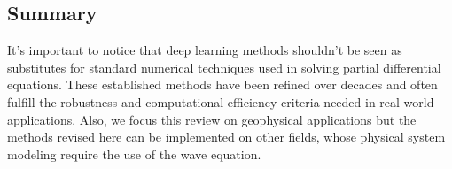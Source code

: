 \documentclass{tufte-handout}
\renewcommand{\citeauthoryear}[2][]{\textcolor{gray}{\citeauthor{#2} (\textcolor{gray}{\citeyear[#1]{#2}})}}
\begin{document}



\subsection{Summary}





It's important to notice that deep learning methods shouldn't be seen as substitutes for standard numerical techniques used in solving partial differential equations. These established methods have been refined over decades and often fulfill the robustness and computational efficiency criteria needed in real-world applications. Also, we focus this review on geophysical applications but the methods revised here can be implemented on other fields, whose physical system modeling require the use of the wave equation. 




\end{document}
